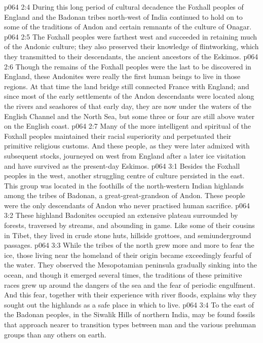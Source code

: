 \vs p064 2:4 During this long period of cultural decadence the Foxhall peoples of England and the Badonan tribes north\hyp{}west of India continued to hold on to some of the traditions of Andon and certain remnants of the culture of Onagar.
\vs p064 2:5 \pc The Foxhall peoples were farthest west and succeeded in retaining much of the Andonic culture; they also preserved their knowledge of flintworking, which they transmitted to their descendants, the ancient ancestors of the Eskimos.
\vs p064 2:6 Though the remains of the Foxhall peoples were the last to be discovered in England, these Andonites were really the first human beings to live in those regions. At that time the land bridge still connected France with England; and since most of the early settlements of the Andon descendants were located along the rivers and seashores of that early day, they are now under the waters of the English Channel and the North Sea, but some three or four are still above water on the English coast.
\vs p064 2:7 Many of the more intelligent and spiritual of the Foxhall peoples maintained their racial superiority and perpetuated their primitive religious customs. And these people, as they were later admixed with subsequent stocks, journeyed on west from England after a later ice visitation and have survived as the present\hyp{}day Eskimos.
\vs p064 3:1 Besides the Foxhall peoples in the west, another struggling centre of culture persisted in the east. This group was located in the foothills of the north\hyp{}western Indian highlands among the tribes of Badonan, a great\hyp{}great\hyp{}grandson of Andon. These people were the only descendants of Andon who never practised human sacrifice.
\vs p064 3:2 These highland Badonites occupied an extensive plateau surrounded by forests, traversed by streams, and abounding in game. Like some of their cousins in Tibet, they lived in crude stone huts, hillside grottoes, and semiunderground passages.
\vs p064 3:3 While the tribes of the north grew more and more to fear the ice, those living near the homeland of their origin became exceedingly fearful of the water. They observed the Mesopotamian peninsula gradually sinking into the ocean, and though it emerged several times, the traditions of these primitive races grew up around the dangers of the sea and the fear of periodic engulfment. And this fear, together with their experience with river floods, explains why they sought out the highlands as a safe place in which to live.
\vs p064 3:4 To the east of the Badonan peoples, in the Siwalik Hills of northern India, may be found fossils that approach nearer to transition types between man and the various prehuman groups than any others on earth.
